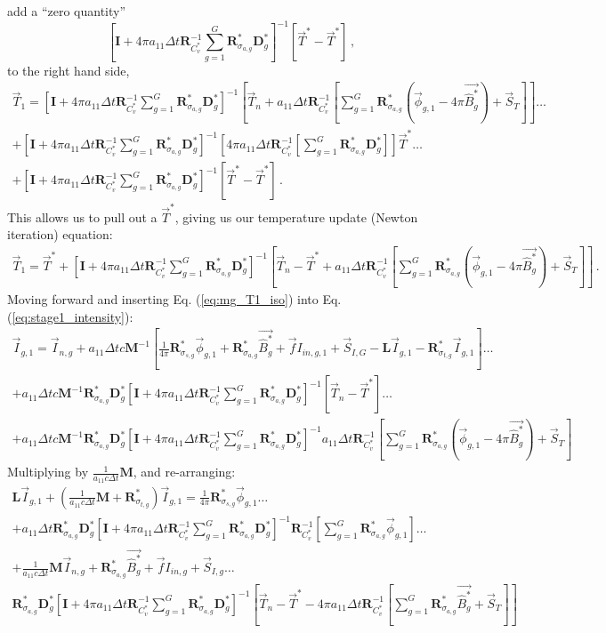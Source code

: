 \documentclass[11pt]{article}
\newcommand{\be}{\begin{equation*}}
\newcommand{\ee}{\end{equation*}}
\newcommand{\eqt}[1]{Eq. (\ref{#1})}
\newcommand{\pec}{\, ,}
\newcommand{\pep}{\, .}
\newcommand{\M}{\ensuremath{ \mathbf M}}
\newcommand{\R}{\ensuremath{{\mathbf R}}}
\newcommand{\Rag}{\ensuremath{{\mathbf R}_{\sigma_{a,g}}^*}}
\newcommand{\Rsg}{\ensuremath{{\mathbf R}_{\sigma_{s,g}}^*}}
\newcommand{\Rtg}{\ensuremath{{\mathbf R}_{\sigma_{t,g}}^*}}
\newcommand{\Dg}{\ensuremath{ \mathbf D}^*_g}
\newcommand{\Pgvec}{\ensuremath{ \vec{\widehat{B}^*_g}}}
\newcommand{\I}{\ensuremath{\mathbf{I}}}
\begin{document}
%
add a ``zero quantity'' 
\be
\left[\I + 4\pi a_{11} \Delta t \R_{C_v^*}^{-1}\sum_{g=1}^G{\Rag \Dg  }\right]^{-1}\left[\vec{T}^* - \vec{T}^*  \right] \pec
\ee
%
to the right hand side,
%
\begin{multline*}
\vec{T}_1 = \left[\I + 4\pi a_{11} \Delta t \R_{C_v^*}^{-1}\sum_{g=1}^G{\Rag \Dg }\right]^{-1}
\left[\vec{T}_n + 
a_{11} \Delta t \R_{C_v^*}^{-1}\left[ \sum_{g=1}^G{ \Rag \left(\vec{\phi}_{g,1} - 4\pi \Pgvec  \right) } + \vec{S}_T \right]  \right]  \dots  \\
+  \left[\I+ 4\pi a_{11} \Delta t \R_{C_v^*}^{-1}\sum_{g=1}^G{\Rag \Dg }\right]^{-1}
\left[ 4\pi a_{11} \Delta t \R_{C_v^*}^{-1}\left[\sum_{g=1}^G{\Rag \Dg } \right]  \right]\vec{T}^* \dots \\
+ \left[\I + 4\pi a_{11} \Delta t \R_{C_v^*}^{-1}\sum_{g=1}^G{\Rag \Dg  }\right]^{-1}\left[\vec{T}^* - \vec{T}^*  \right] \pep
\end{multline*}
% 
This allows us to pull out a $\vec{T}^*$, giving us our temperature update (Newton iteration) equation:
%
\begin{multline}
\vec{T}_1 = \vec{T}^* + \left[\I+ 4\pi a_{11} \Delta t \R_{C_v^*}^{-1}\sum_{g=1}^G{\Rag \Dg  }\right]^{-1}
\left[\vec{T}_n -\vec{T}^* + 
a_{11} \Delta t \R_{C_v^*}^{-1}\left[ \sum_{g=1}^G{ \Rag \left (\vec{\phi}_{g,1} - 4\pi \Pgvec  \right ) }  + \vec{S}_T \right] \right]\pep
\label{eq:mg_T1_iso}
\end{multline}
%
%
Moving forward and inserting \eqt{eq:mg_T1_iso} into \eqt{eq:stage1_intensity}:
%
%
\begin{multline*}
\vec{I}_{g,1} = \vec{I}_{n,g} + a_{11} \Delta t c \M^{-1} \left[\frac{1}{4\pi}\Rsg \vec{\phi}_{g,1} + \Rag \Pgvec + \vec{f}I_{in,g,1} + \vec{S}_{I,G} - \mathbf{L} \vec{I}_{g,1} - \Rtg \vec{I}_{g,1} \right] \dots \\
+ a_{11}\Delta t c \M^{-1} \Rag \Dg \left[\I + 4\pi a_{11} \Delta t \R_{C_v^*}^{-1}\sum_{g=1}^G{ \Rag \Dg }\right]^{-1}
\left[\vec{T}_n -\vec{T}^*\right] \dots \\
 +  a_{11}\Delta t c \M^{-1} \Rag \Dg \left[\I + 4\pi a_{11} \Delta t \R_{C_v^*}^{-1}\sum_{g=1}^G{ \Rag \Dg }\right]^{-1} 
a_{11} \Delta t \R_{C_v^*}^{-1} \left[ \sum_{g=1}^G{ \Rag \left(\vec{\phi}_{g,1} - 4\pi \Pgvec \right) } + \vec{S}_T \right]
\end{multline*}
%
%
Multiplying by $\frac{1}{a_{11}c\Delta t}\M$, and re-arranging:
%
%
\begin{multline}
\mathbf{L} \vec{I}_{g,1} + \left( \frac{1}{a_{11} c \Delta t }\M + \Rtg  \right) \vec{I}_{g,1} = \frac{1}{4\pi} \Rsg \vec{\phi}_{g,1} \dots \\
+ a_{11}\Delta t \Rag \Dg \left[ \I + 4\pi a_{11} \Delta t \R_{C_v^*}^{-1}\sum_{g=1}^G{\Rag \Dg }\right]^{-1}\R_{C_v^*}^{-1}\left[\sum_{g=1}^G{\Rag \vec{\phi}_{g,1} }\right]   \dots \\
+ \frac{1}{a_{11} c \Delta t}\M \vec{I}_{n,g} + \Rag \Pgvec +  \vec{f}I_{in,g} + \vec{S}_{I,g} \dots \\
\Rag \Dg \left[\I+ 4\pi a_{11} \Delta t \R_{C_v^*}^{-1}\sum_{g=1}^G{\Rag \Dg  }\right]^{-1}
\left[\vec{T}_n - \vec{T}^* - 4\pi a_{11}\Delta t \R_{C_v^*}^{-1}\left[ \sum_{g=1}^G{\Rag \Pgvec } + \vec{S}_T \right] \right]
\label{eq:toolong1}
\end{multline}
\end{document}
